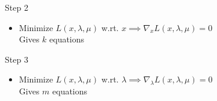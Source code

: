 \documentclass{beamer}
\begin{document}
\begin{frame}{Step 2}
	\begin{itemize}
		\item Minimize $L(x, \lambda, \mu)$ w.rt. $x \implies \nabla_xL(x, \lambda, \mu) = 0 $\\
		Gives $k$ equations
	\end{itemize}
\end{frame}

\begin{frame}{Step 3}
	\begin{itemize}
		\item Minimize $L(x, \lambda, \mu)$ w.rt. $\lambda \implies \nabla_\lambda L(x, \lambda, \mu) = 0 $\\
		Gives $m$ equations
	\end{itemize}
\end{frame}
\end{document}
